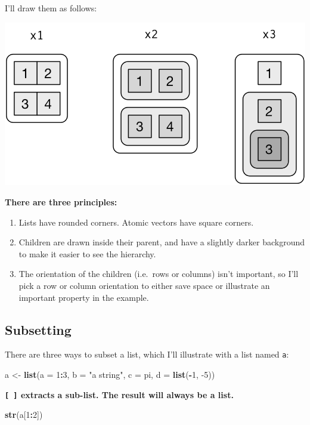 \documentclass[
]{book}
\newenvironment{Shaded}{\begin{snugshade}}{\end{snugshade}}
\newcommand{\DataTypeTok}[1]{\textcolor[rgb]{0.13,0.29,0.53}{#1}}
\newcommand{\DecValTok}[1]{\textcolor[rgb]{0.00,0.00,0.81}{#1}}
\newcommand{\KeywordTok}[1]{\textcolor[rgb]{0.13,0.29,0.53}{\textbf{#1}}}
\newcommand{\NormalTok}[1]{#1}
\newcommand{\OperatorTok}[1]{\textcolor[rgb]{0.81,0.36,0.00}{\textbf{#1}}}
\newcommand{\StringTok}[1]{\textcolor[rgb]{0.31,0.60,0.02}{#1}}
\begin{document}
I'll draw them as follows:

\includegraphics[width=0.5\linewidth]{./images/lists-structure}

\textbf{There are three principles:}

\begin{enumerate}
\def\labelenumi{\arabic{enumi}.}
\item
  Lists have rounded corners. Atomic vectors have square corners.
\item
  Children are drawn inside their parent, and have a slightly darker background to make it easier to see the hierarchy.
\item
  The orientation of the children (i.e.~rows or columns) isn't important, so I'll pick a row or column orientation to either save space or illustrate an important property in the example.
\end{enumerate}

\hypertarget{subsetting}{%
\subsection{Subsetting}\label{subsetting}}

There are three ways to subset a list, which I'll illustrate with a list named \texttt{a}:

\begin{Shaded}
\begin{Highlighting}[]
\NormalTok{a <-}\StringTok{ }\KeywordTok{list}\NormalTok{(}\DataTypeTok{a =} \DecValTok{1}\OperatorTok{:}\DecValTok{3}\NormalTok{, }\DataTypeTok{b =} \StringTok{"a string"}\NormalTok{, }\DataTypeTok{c =}\NormalTok{ pi, }\DataTypeTok{d =} \KeywordTok{list}\NormalTok{(}\OperatorTok{-}\DecValTok{1}\NormalTok{, }\DecValTok{-5}\NormalTok{))}
\end{Highlighting}
\end{Shaded}

\textbf{\texttt{{[}\ {]}} extracts a sub-list. The result will always be a list.}

\begin{Shaded}
\begin{Highlighting}[]
    \KeywordTok{str}\NormalTok{(a[}\DecValTok{1}\OperatorTok{:}\DecValTok{2}\NormalTok{])}
\end{Highlighting}
\end{Shaded}
\end{document}
